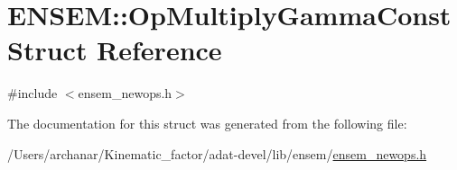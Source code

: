 \hypertarget{structENSEM_1_1OpMultiplyGammaConst}{}\section{E\+N\+S\+EM\+:\+:Op\+Multiply\+Gamma\+Const Struct Reference}
\label{structENSEM_1_1OpMultiplyGammaConst}


{\ttfamily \#include $<$ensem\+\_\+newops.\+h$>$}



The documentation for this struct was generated from the following file\+:\begin{DoxyCompactItemize}
\item 
/\+Users/archanar/\+Kinematic\+\_\+factor/adat-\/devel/lib/ensem/\mbox{\hyperlink{adat-devel_2lib_2ensem_2ensem__newops_8h}{ensem\+\_\+newops.\+h}}\end{DoxyCompactItemize}
